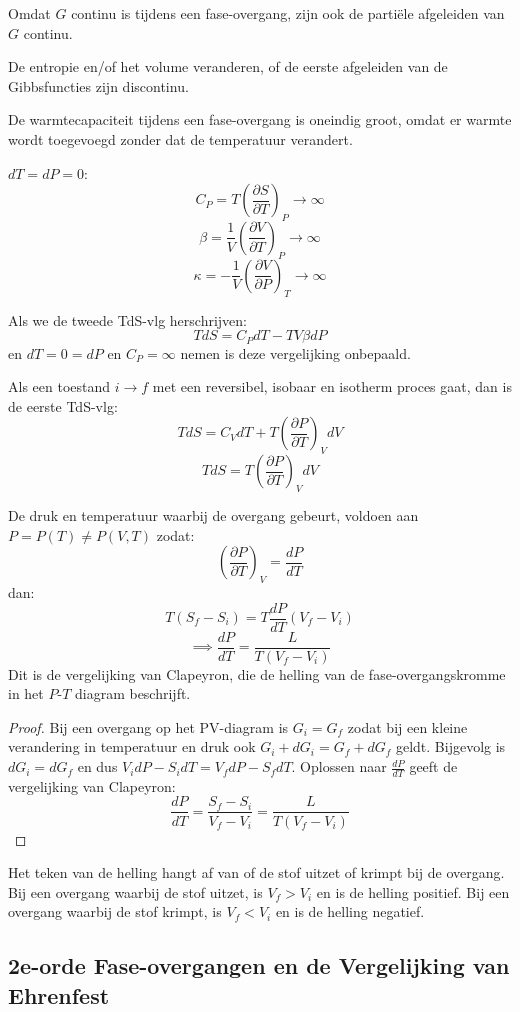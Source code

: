 Omdat \(G\) continu is tijdens een fase-overgang, zijn ook de partiële afgeleiden van \(G\) continu.

De entropie en/of het volume veranderen, of de eerste afgeleiden van de Gibbsfuncties zijn discontinu.

De warmtecapaciteit tijdens een fase-overgang is oneindig groot, omdat er warmte wordt toegevoegd zonder dat de temperatuur verandert.

\(dT=dP=0\):
\[C_P = T\left(\frac{\partial S}{\partial T}\right)_P \to \infty\]
\[\beta = \frac{1}{V} \left(\frac{\partial V}{\partial T}\right)_P \to \infty\]
\[\kappa = -\frac{1}{V} \left(\frac{\partial V}{\partial P}\right)_T \to \infty\]

Als we de tweede TdS-vlg herschrijven:
\[TdS = C_PdT - TV\beta dP\]
en \(dT = 0 = dP\) en \( C_P = \infty \) nemen is deze vergelijking onbepaald.

Als een toestand \(i \to f\) met een reversibel, isobaar en isotherm proces gaat, dan is de eerste TdS-vlg:
\[TdS = C_V dT + T\left(\frac{\partial P}{\partial T}\right)_V dV\]
\[TdS = T\left(\frac{\partial P}{\partial T}\right)_V dV\]

De druk en temperatuur waarbij de overgang gebeurt, voldoen aan \(P = P(T) \neq P(V,T)\) zodat:
\[\left(\frac{\partial P}{\partial T}\right)_V = \frac{dP}{dT}\]
dan:
\[T(S_f-S_i) = T \frac{dP}{dT}(V_f-V_i)\]
\[\implies \frac{dP}{dT} = \frac{L}{T(V_f - V_i)}\]
Dit is de vergelijking van Clapeyron, die de helling van de fase-overgangskromme in het \(P\)-\(T\) diagram beschrijft.

\begin{proof}
    Bij een overgang op het PV-diagram is \(G_i = G_f\)
    zodat bij een kleine verandering in temperatuur en druk ook \(G_i + dG_i = G_f + dG_f\) geldt.
    Bijgevolg is \(dG_i = dG_f\) en dus \(V_idP - S_idT = V_fdP - S_fdT\).
    Oplossen naar \(\frac{dP}{dT}\) geeft de vergelijking van Clapeyron:
    \[\frac{dP}{dT} = \frac{S_f - S_i}{V_f - V_i} = \frac{L}{T(V_f - V_i)}\]
\end{proof}

Het teken van de helling hangt af van of de stof uitzet of krimpt bij de overgang.
Bij een overgang waarbij de stof uitzet, is \(V_f > V_i\) en is de helling positief. Bij een overgang waarbij de stof krimpt, is \(V_f < V_i\) en is de helling negatief.


\subsection{2e-orde Fase-overgangen en de Vergelijking van Ehrenfest}

